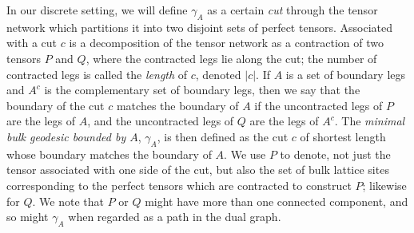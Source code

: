 \documentclass[12pt]{article}
\theoremstyle{plain}
\theoremstyle{plain}
\theoremstyle{plain}
\theoremstyle{plain}
\theoremstyle{result}
\theoremstyle{remark}
\theoremstyle{conjecture}
\theoremstyle{observation}
\theoremstyle{definition}
\theoremstyle{corollary}
\theoremstyle{definition}
\theoremstyle{definition}
\theoremstyle{assumption}
\theoremstyle{definition}
\theoremstyle{problem}
\theoremstyle{fact}
\begin{document}
In our discrete setting, we will define $\gamma_A$ as a certain \textit{cut} through the tensor network which partitions it into two disjoint sets of perfect tensors. 
Associated with a cut $c$ is a decomposition of the tensor network as a contraction of two tensors $P$ and $Q$, where the contracted legs lie along the cut; the number of contracted legs is called the \textit{length} of $c$, denoted $|c|$. If $A$ is a set of boundary legs and $A^c$ is the complementary set of boundary legs, then we say that the boundary of the cut $c$ matches the boundary of $A$ if the uncontracted legs of $P$ are the legs of $A$, and the uncontracted legs of $Q$ are the legs of $A^c$. 
The \textit{minimal bulk geodesic bounded by $A$}, $\gamma_A$, is then defined as the cut $c$ of shortest length whose boundary matches the boundary of $A$. 
We use $P$ to denote, not just the tensor associated with one side of the cut, but also the set of bulk lattice sites corresponding to the perfect tensors which are contracted to construct $P$; likewise for $Q$. 
We note that $P$ or $Q$ might have more than one connected component, and so might $\gamma_A$ when regarded as a path in the dual graph.
\end{document}
